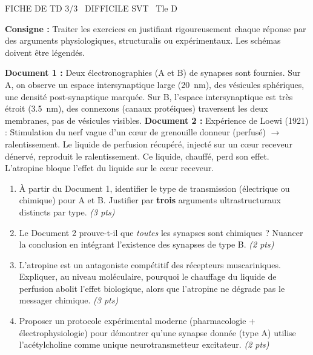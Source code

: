 \documentclass[11pt]{article}
\begin{document}
\begin{tcolorbox}[enhanced,colback=popink,colframe=popink,arc=10pt,boxrule=0pt,left=12pt,right=12pt,top=9pt,bottom=9pt]
{\color{white}\popxbold\small FICHE DE TD 3/3 \textbullet\ DIFFICILE \hfill SVT \textbullet\ Tle D\par}
\end{tcolorbox}
\vspace{4pt}
\noindent \textbf{Consigne :} Traiter les exercices en justifiant rigoureusement chaque réponse par des arguments physiologiques, structuralis ou expérimentaux. Les schémas doivent être légendés.

\begin{exercice}
\textbf{Document 1 :} Deux électronographies (A et B) de synapses sont fournies. Sur A, on observe un espace intersynaptique large (\SI{20}{\nano\meter}), des vésicules sphériques, une densité post-synaptique marquée. Sur B, l'espace intersynaptique est très étroit (\SI{3,5}{\nano\meter}), des connexons (canaux protéiques) traversent les deux membranes, pas de vésicules visibles.
\textbf{Document 2 :} Expérience de Loewi (1921) : Stimulation du nerf vague d'un cœur de grenouille donneur (perfusé) $\rightarrow$ ralentissement. Le liquide de perfusion récupéré, injecté sur un cœur receveur dénervé, reproduit le ralentissement. Ce liquide, chauffé, perd son effet. L'atropine bloque l'effet du liquide sur le cœur receveur.
\begin{enumerate}
\item À partir du Document 1, identifier le type de transmission (électrique ou chimique) pour A et B. Justifier par \textbf{trois} arguments ultrastructuraux distincts par type. \textit{(3 pts)}
\item Le Document 2 prouve-t-il que \textit{toutes} les synapses sont chimiques ? Nuancer la conclusion en intégrant l'existence des synapses de type B. \textit{(2 pts)}
\item L'atropine est un antagoniste compétitif des récepteurs muscariniques. Expliquer, au niveau moléculaire, pourquoi le chauffage du liquide de perfusion abolit l'effet biologique, alors que l'atropine ne dégrade pas le messager chimique. \textit{(3 pts)}
\item Proposer un protocole expérimental moderne (pharmacologie + électrophysiologie) pour démontrer qu'une synapse donnée (type A) utilise l'acétylcholine comme unique neurotransmetteur excitateur. \textit{(2 pts)}
\end{enumerate}
\end{exercice}
\end{document}
